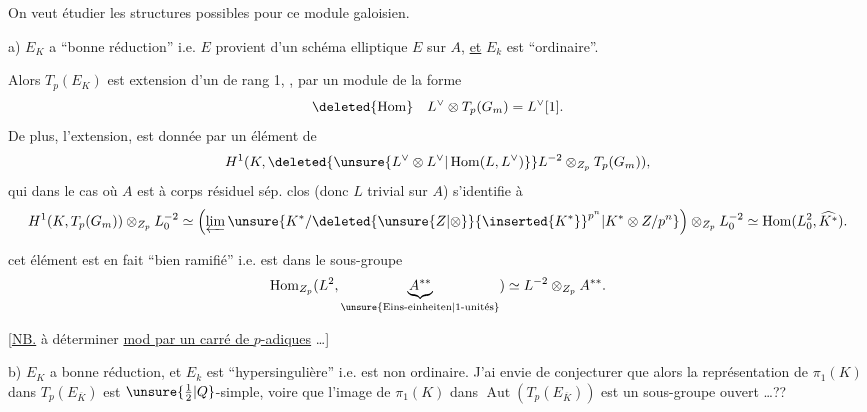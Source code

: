 On veut étudier les structures possibles pour ce module galoisien.

a) $E_K$ a ``bonne réduction'' i.e. $E$ provient d'un schéma elliptique $E$ sur $A$, \uline{et} $E_k$ est ``ordinaire''.

Alors $T_p(E_K)$ est  extension d'un   de rang 1, , par un  module de la forme
\[
\deleted{\operatorname{Hom}}\quad L^{\vee}\otimes T_p(G_m)=L^{\vee}[1].
\]
De plus, l'extension,  est donnée par un élément de
\[
H^1(K,\deleted{\unsure{L^{\vee}\otimes L^{\vee}|\operatorname{Hom}(L,L^{\vee})}}L^{-2}\otimes_{Z_p}T_p(G_m)),
\]
qui dans le cas où $A$ est à corps résiduel sép. clos (donc $L$ trivial sur $A$) s'identifie à
\[
H^1(K,T_p(G_m))\otimes_{Z_p}L_0^{-2}
\simeq\left(\varprojlim\unsure{K^*/\deleted{\unsure{Z|\otimes}}{\inserted{K^*}}^{p^n}|K^*\otimes Z/p^n}\right)\otimes_{Z_p}L_0^{-2}
\simeq\operatorname{Hom}(L_0^2,\widehat{K^*}).
\]



 cet  élément est en fait ``bien ramifié'' i.e. est dans le sous-groupe
\[
\operatorname{Hom}_{Z_p}(L^2,\underbrace{A^{**}}_{\text{\unsure{Eins-einheiten|1-unités}}})\simeq L^{-2}\otimes_{Z_p}A^{**}.
\]

[\uline{NB.}  à déterminer \uline{mod   par un carré de   $p$-adiques} \dots]


b) $E_K$ a bonne réduction, et $E_k$ est ``hypersingulière'' i.e. est non ordinaire. J'ai envie de conjecturer que alors la représentation de $\pi_1(K)$ dans $T_p(E_{\overline K})$ est $\unsure{\frac12|Q}$-simple, voire que l'image de $\pi_1(K)$ dans $\operatorname{Aut}(T_p(E_{\overline K}))$ est un sous-groupe ouvert \dots ??

